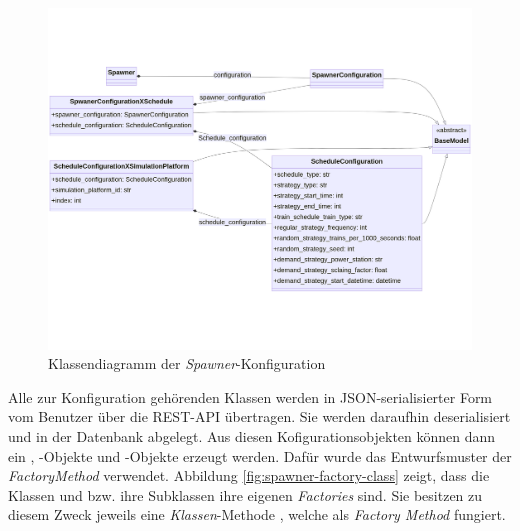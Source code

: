 \begin{figure}[htb]
	\centering
	\includegraphics[width=1.0\linewidth]{images/diagrams/spawner-config-class.png}
	\caption{Klassendiagramm der \emph{Spawner}-Konfiguration}
	\label{fig:spawner-config-class}
\end{figure}

Alle zur Konfiguration gehörenden Klassen werden in JSON-serialisierter Form vom Benutzer über die REST-API übertragen\cite{kamp_architektur_2023}. Sie werden daraufhin deserialisiert und in der Datenbank abgelegt. Aus diesen Kofigurationsobjekten können dann ein , -Objekte und -Objekte erzeugt werden. Dafür wurde das Entwurfsmuster der \emph{FactoryMethod} verwendet. Abbildung \ref{fig:spawner-factory-class} zeigt, dass die Klassen  und  bzw. ihre Subklassen ihre eigenen \emph{Factories} sind. Sie besitzen zu diesem Zweck jeweils eine \emph{Klassen}-Methode , welche als \emph{Factory Method} fungiert.

